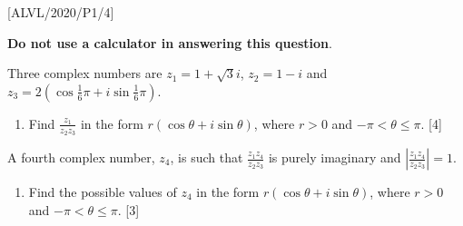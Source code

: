 \item {[}ALVL/2020/P1/4{]}

\textbf{Do not use a calculator in answering this question}. 

Three complex numbers are $z_{1}=1+\sqrt{3}i$, $z_{2}=1-i$ and $z_{3}=2\left(\cos\frac{1}{6}\pi+i\sin\frac{1}{6}\pi\right)$.
\begin{enumerate}
\item Find $\frac{z_{1}}{z_{2}z_{3}}$ in the form $r\left(\cos\theta+i\sin\theta\right)$,
where $r>0$ and $-\pi<\theta\leq\pi$. \hfill{}{[}4{]}
\end{enumerate}
A fourth complex number, $z_{4}$, is such that $\frac{z_{1}z_{4}}{z_{2}z_{3}}$
is purely imaginary and $\left|\frac{z_{1}z_{4}}{z_{2}z_{3}}\right|=1$. 
\begin{enumerate}
\item Find the possible values of $z_{4}$ in the form $r\left(\cos\theta+i\sin\theta\right)$,
where $r>0$ and $-\pi<\theta\leq\pi$.\hfill{} {[}3{]}
\end{enumerate}
